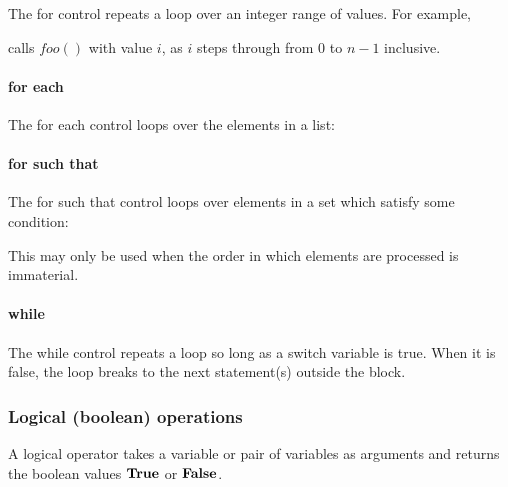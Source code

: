 The for control repeats a loop over an integer range of values. For example,

\begin{pseudo*}
\bsEND
\end{pseudo*}

calls $foo()$ with value $i$, as $i$ steps through from 0 to $n-1$ inclusive.


\paragraph*{for each} The for each control loops over the elements in
a list:

\begin{pseudo*}
\bsEND
\end{pseudo*}

\paragraph*{for such that} The for such that control loops over elements in
a set which satisfy some condition:

\begin{pseudo*}
\bsEND
\end{pseudo*}

This may only be used when the order in which elements are processed is 
immaterial.

\paragraph*{while}

The while control repeats a loop so long as a switch variable is true. 
When it is false, the loop breaks to the next statement(s) outside the block.

\begin{pseudo*}
\bsEND
{}
\end{pseudo*}

\subsubsection{Logical (boolean) operations}
\label{booleanops}

A logical operator takes a variable or pair of variables as arguments and
returns the boolean values $\text{\bf{True}}$ or $\text{\bf{False}}$.

